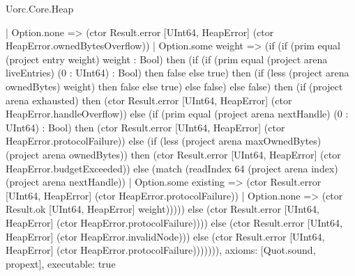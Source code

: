 \begin{lexlean}{Uorc.Core.Heap}
\begin{semanticmodule}
{        | Option.none => (ctor Result.error [UInt64, HeapError] (ctor HeapError.ownedBytesOverflow))
        | Option.some weight => (if (if (prim equal (project entry weight) weight : Bool) then (if (if (prim equal (project arena liveEntries) (0 : UInt64) : Bool) then false else true) then (if (less (project arena ownedBytes) weight) then false else true) else false) else false) then (if (project arena exhausted) then (ctor Result.error [UInt64, HeapError] (ctor HeapError.handleOverflow)) else (if (prim equal (project arena nextHandle) (0 : UInt64) : Bool) then (ctor Result.error [UInt64, HeapError] (ctor HeapError.protocolFailure)) else (if (less (project arena maxOwnedBytes) (project arena ownedBytes)) then (ctor Result.error [UInt64, HeapError] (ctor HeapError.budgetExceeded)) else (match (readIndex 64 (project arena index) (project arena nextHandle))
          | Option.some existing => (ctor Result.error [UInt64, HeapError] (ctor HeapError.protocolFailure))
          | Option.none => (ctor Result.ok [UInt64, HeapError] weight))))) else (ctor Result.error [UInt64, HeapError] (ctor HeapError.protocolFailure)))) else (ctor Result.error [UInt64, HeapError] (ctor HeapError.invalidNode))) else (ctor Result.error [UInt64, HeapError] (ctor HeapError.protocolFailure))))))),
  axioms: [Quot.sound, propext],
  executable: true
}


\end{semanticmodule}
\end{lexlean}
